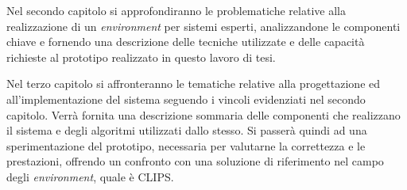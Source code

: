 Nel secondo capitolo si approfondiranno le problematiche relative alla realizzazione di un \emph{environment} per sistemi esperti, analizzandone le componenti chiave e fornendo una descrizione delle tecniche utilizzate e delle capacità richieste al prototipo realizzato in questo lavoro di tesi.

Nel terzo capitolo  si affronteranno le tematiche relative alla progettazione ed all'implementazione del sistema seguendo i vincoli evidenziati nel secondo capitolo. Verrà fornita una descrizione sommaria delle componenti che realizzano il sistema e degli algoritmi utilizzati dallo stesso. Si passerà quindi ad una sperimentazione del prototipo, necessaria per valutarne la correttezza e le prestazioni, offrendo un confronto con una soluzione di riferimento nel campo degli \emph{environment}, quale è CLIPS.

\clearpage